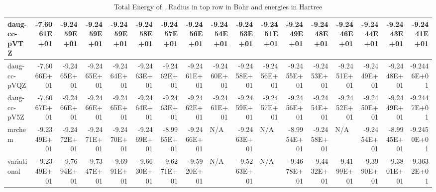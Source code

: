 \documentclass[../master_thesis.tex]{subfiles}
\begin{document}
\begin{table}
{{\begin{tabular}{|l|r|r|r|r|r|r|r|r|r|r|r|r|r|r|r|r|}
daug-cc-pVTZ & -7.6061E+01 & -9.2459E+01 & -9.2459E+01 & -9.2459E+01 & -9.2458E+01 & -9.2457E+01 & -9.2456E+01 & -9.2454E+01 & -9.2453E+01 & -9.2451E+01 & -9.2449E+01 & -9.2448E+01 & -9.2446E+01 & -9.2444E+01 & -9.2443E+01 & -9.2441E+01  \\ \hline
daug-cc-pVQZ & -7.6066E+01 & -9.2465E+01 & -9.2465E+01 & -9.2464E+01 & -9.2463E+01 & -9.2462E+01 & -9.2461E+01 & -9.2460E+01 & -9.2458E+01 & -9.2456E+01 & -9.2455E+01 & -9.2453E+01 & -9.2451E+01 & -9.2449E+01 & -9.2448E+01 & -9.2446E+01  \\ \hline
daug-cc-pV5Z & -7.6067E+01 & -9.2466E+01 & -9.2466E+01 & -9.2465E+01 & -9.2464E+01 & -9.2463E+01 & -9.2462E+01 & -9.2461E+01 & -9.2459E+01 & -9.2457E+01 & -9.2456E+01 & -9.2454E+01 & -9.2452E+01 & -9.2450E+01 & -9.2449E+01 & -9.2447E+01  \\ \hline
mrchem & -9.2349E+01 & -9.2472E+01 & -9.2471E+01 & -9.2470E+01 & -9.2469E+01 & -8.9965E+01 & -9.2466E+01 & \multicolumn{1}{l|}{N/A} & -9.2463E+01 & \multicolumn{1}{l|}{N/A} & -8.9954E+01 & -9.2458E+01 & \multicolumn{1}{l|}{N/A} & -9.2454E+01 & -8.9945E+01 & -9.2450E+01  \\ \hline
variational & -9.2349E+01 & -9.7694E+01 & -9.7347E+01 & -9.6991E+01 & -9.6630E+01 & -9.6271E+01 & -9.5920E+01 & \multicolumn{1}{l|}{N/A} & -9.5263E+01 & \multicolumn{1}{l|}{N/A} & -9.4678E+01 & -9.4432E+01 & -9.4199E+01 & -9.3990E+01 & -9.3801E+01 & -9.3632E+01  \\ \hline
\end{tabular}}} {\caption{Total Energy of .  Radius in top row in Bohr and energies in Hartree}
\label{tab:rawcyandata}}

\ttabbox{

\resizebox{\textwidth}{!}{

}}
\end{table}
\end{document}
